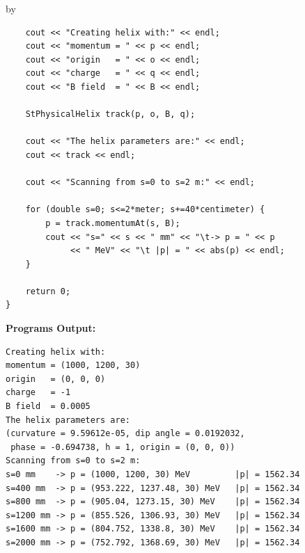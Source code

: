 \documentclass[twoside]{article}
\newcommand{\entrylabel}[1]{\mbox{\textbf{{#1}}}\hfil}%
\newenvironment{entry}
{\begin{list}{}%
    {\renewcommand{\makelabel}{\entrylabel}%
     \setlength{\labelwidth}{90pt}%
     \setlength{\leftmargin}{\labelwidth}
     \advance\leftmargin by \labelsep%
      }%
    }%
  {\end{list}}
\newcommand{\Entrylabel}[1]%
{\raisebox{0pt}[1ex][0pt]{\makebox[\labelwidth][l]%
    {\parbox[t]{\labelwidth}{\hspace{0pt}\textbf{{#1}}}}}}
\newenvironment{Entry}%
{\renewcommand{\entrylabel}{\Entrylabel}\begin{entry}}%
  {\end{entry}}
\begin{document}
\begin{Entry}
{\begin{verbatim}
    cout << "Creating helix with:" << endl;
    cout << "momentum = " << p << endl;
    cout << "origin   = " << o << endl;
    cout << "charge   = " << q << endl;
    cout << "B field  = " << B << endl;

    StPhysicalHelix track(p, o, B, q);

    cout << "The helix parameters are:" << endl;
    cout << track << endl;
    
    cout << "Scanning from s=0 to s=2 m:" << endl;

    for (double s=0; s<=2*meter; s+=40*centimeter) {
        p = track.momentumAt(s, B);
        cout << "s=" << s << " mm" << "\t-> p = " << p
             << " MeV" << "\t |p| = " << abs(p) << endl; 
    }
    
    return 0;
}
\end{verbatim}
}%
{\bf Programs Output:}
{\footnotesize
\begin{verbatim}
Creating helix with:
momentum = (1000, 1200, 30)
origin   = (0, 0, 0)
charge   = -1
B field  = 0.0005
The helix parameters are:
(curvature = 9.59612e-05, dip angle = 0.0192032,
 phase = -0.694738, h = 1, origin = (0, 0, 0))
Scanning from s=0 to s=2 m:
s=0 mm    -> p = (1000, 1200, 30) MeV         |p| = 1562.34
s=400 mm  -> p = (953.222, 1237.48, 30) MeV   |p| = 1562.34
s=800 mm  -> p = (905.04, 1273.15, 30) MeV    |p| = 1562.34
s=1200 mm -> p = (855.526, 1306.93, 30) MeV   |p| = 1562.34
s=1600 mm -> p = (804.752, 1338.8, 30) MeV    |p| = 1562.34
s=2000 mm -> p = (752.792, 1368.69, 30) MeV   |p| = 1562.34
\end{verbatim}
} %
\end{Entry}

\clearpage

%
%
\end{document}
